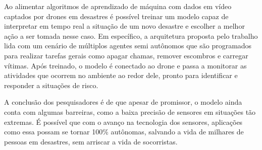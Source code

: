 \documentclass[12pt]{article}
\begin{document}
Ao alimentar algoritmos de aprendizado de máquina com dados em vídeo captados por drones em desastres é possível treinar um modelo capaz de interpretar em tempo real a situação
de um novo desastre e escolher a melhor ação a ser tomada nesse caso. Em específico, a arquitetura proposta pelo trabalho lida com um cenário de múltiplos agentes semi autônomos
que são programados para realizar tarefas gerais como apagar chamas, remover escombros e carregar vítimas. Após treinado, o modelo é conectado ao drone e passa a monitorar as atividades
que ocorrem no ambiente ao redor dele, pronto para identificar e responder a situações de risco.

A conclusão dos pesquisadores é de que apesar de promissor, o modelo ainda conta com algumas barreiras, como a baixa precisão de sensores em situações tão extremas. É possível que com o avanço
na tecnologia dos sensores, aplicações como essa possam se tornar 100\% autônomas, salvando a vida de milhares de pessoas em desastres, sem arriscar a vida de socorristas.

\nocite{*}
\medskip



\end{document}

